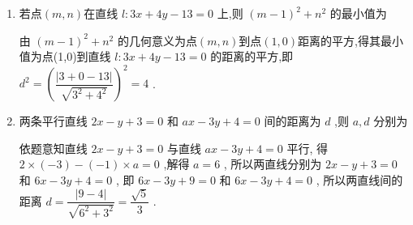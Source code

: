 \begin{enumerate}
\begin{enumerate}
\begin{jieda}
\begin{dingautolist}{172}
                因此原点到直线的距离 $d = \dfrac{\left| {10} - 5k\right| }{\sqrt{{k}^{2} + 1}} = 5$，解得 $k = \dfrac{3}{4}$，故所求直线方程为 ${3x} - {4y} + {25} = 0$ .
            \end{dingautolist}
            综上,所求直线方程为 $x - 5 = 0$ 或 ${3x} - {4y} + {25} = 0$ .
        \end{jieda}
        
        \item 若点$(m,n)$在直线 $l : {3x} + {4y} - {13} = 0$ 上,则 ${\left( m - 1\right) }^{2} + {n}^{2}$ 的最小值为
        \begin{jieda}
            由 ${\left( m - 1\right) }^{2} + {n}^{2}$ 的几何意义为点$(m,n)$到点$(1,0)$距离的平方,得其最小值为点(1,0)到直线 $l : {3x} + {4y} - {13} = 0$ 的距离的平方,即 ${d}^{2} = {\left( \dfrac{\left| 3 + 0 - {13}\right| }{\sqrt{{3}^{2} + {4}^{2}}}\right) }^{2} = 4$ .
        \end{jieda}
        
        \item 两条平行直线 ${2x} - y + 3 = 0$ 和 ${ax} - {3y} + 4 = 0$ 间的距离为 $d$ ,则 $a,d$ 分别为
        \begin{jieda}
            依题意知直线 ${2x} - y + 3 = 0$ 与直线 ${ax} - {3y} + 4 = 0$ 平行,
            得 $2 \times  \left( {-3}\right)  - \left( {-1}\right)  \times  a = 0$ ,解得 $a = 6$ ,
            所以两直线分别为 ${2x} - y + 3 = 0$ 和 ${6x} - {3y} + 4 = 0$ ,
            即 ${6x} - {3y} + 9 = 0$ 和 ${6x} - {3y} + 4 = 0$ ,
            所以两直线间的距离 $d = \dfrac{\left| 9 - 4\right| }{\sqrt{{6}^{2} + {3}^{2}}} = \dfrac{\sqrt{5}}{3}$ .
        \end{jieda}        


\end{enumerate}
\end{enumerate}

